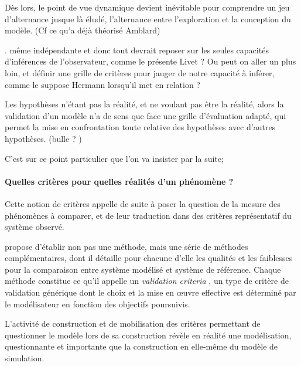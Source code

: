 Dès lors, le point de vue dynamique devient inévitable pour comprendre un jeu d'alternance jusque là éludé, l'alternance entre l'exploration et la conception du modèle. (Cf ce qu'a déjà théorisé Amblard)


. même indépendante et donc tout devrait reposer sur les seules capacités d'inférences de l'observateur, comme le présente Livet ? Ou peut on aller un plus loin, et définir une grille de critères pour jauger de notre capacité à inférer, comme le suppose Hermann lorsqu'il met en relation  ? 



Les hypothèses n'étant pas la réalité, et ne voulant pas être la réalité, alors la validation d'un modèle n'a de sens que face une grille d'évaluation adapté, qui permet la mise en confrontation toute relative des hypothèses avec d'autres hypothèses. (bulle ? )

 C'est sur ce point particulier que l'on va insister par la suite;

\paragraph{Quelles critères pour quelles réalités d'un phénomène ? }

Cette notion de critères appelle de suite à poser la question de la mesure des phénomènes à comparer, et de leur traduction dans des critères représentatif du système observé.

\textcite{Hermann1967, Hermann1967b} propose d'établir non pas une méthode, mais une série de méthodes complémentaires, dont il détaille pour chacune d'elle les qualités et les faiblesses pour la comparaison entre système modélisé et système de référence. Chaque méthode constitue ce qu'il appelle un \textit{validation criteria} , un type de critère de validation générique dont le choix et la mise en œuvre effective est déterminé par le modélisateur en fonction des objectifs poursuivis.










L'activité de construction et de mobilisation des critères permettant de questionner le modèle lors de sa construction révèle en réalité une modélisation, questionnante et importante que la construction en elle-même du modèle de simulation.  %



